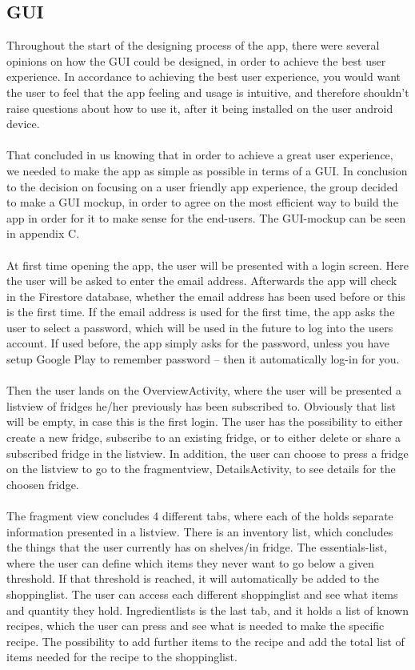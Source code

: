 \documentclass[12pt]{article}
\begin{document}
\subsection{GUI} 
Throughout the start of the designing process of the app, there were several opinions on how the GUI could be designed, in order to achieve the best user experience. In accordance to achieving the best user experience, you would want the user to feel that the app feeling and usage is intuitive, and therefore shouldn’t raise questions about how to use it, after it being installed on the user android device. 
\\
\\
That concluded in us knowing that in order to achieve a great user experience, we needed to make the app as simple as possible in terms of a GUI.
In conclusion to the decision on focusing on a user friendly app experience, the group decided to make a GUI mockup, in order to agree on the most efficient way to build the app in order for it to make sense for the end-users. The GUI-mockup can be seen in appendix C.
\\
\\
At first time opening the app, the user will be presented with a login screen. Here the user will be asked to enter the email address. Afterwards the app will check in the Firestore database, whether the email address has been used before or this is the first time. If the email address is used for the first time, the app asks the user to select a password, which will be used in the future to log into the users account. If used before, the app simply asks for the password, unless you have setup Google Play to remember password – then it automatically log-in for you.
\\
\\
Then the user lands on the OverviewActivity, where the user will be presented a listview of fridges he/her previously has been subscribed to. Obviously that list will be empty, in case this is the first login. The user has the possibility to either create a new fridge, subscribe to an existing fridge, or to either delete or share a subscribed fridge in the listview. In addition, the user can choose to press a fridge on the listview to go to the fragmentview, DetailsActivity, to see details for the choosen fridge.
\\
\\
The fragment view concludes 4 different tabs, where each of the holds separate information presented in a listview. There is an inventory list, which concludes the things that the user currently has on shelves/in fridge. The essentials-list, where the user can define which items they never want to go below a given threshold. If that threshold is reached, it will automatically be added to the shoppinglist. The user can access each different shoppinglist and see what items and quantity they hold. Ingredientlists is the last tab, and it holds a list of known recipes, which the user can press and see what is needed to make the specific recipe. The possibility to add further items to the recipe and add the total list of items needed for the recipe to the shoppinglist.
\end{document}
